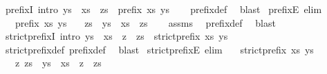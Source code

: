 \begin{isabellebody}
\endisatagproof
{\isafoldproof}%
%
\isadelimproof
\isanewline
%
\endisadelimproof
\isanewline
{}\isamarkupfalse%
\ prefixI\ {\isacharbrackleft}intro{\isacharquery}{\isacharbrackright}{\isacharcolon}\ {\isachardoublequoteopen}ys\ {\isacharequal}\ xs\ {\isacharat}\ zs\ {\isasymLongrightarrow}\ prefix\ xs\ ys{\isachardoublequoteclose}\isanewline
%
\isadelimproof
\ \ %
\endisadelimproof
%
\isatagproof
{}\isamarkupfalse%
\ prefix{\isacharunderscore}def\ \isamarkupfalse%
\ blast%
\endisatagproof
{\isafoldproof}%
%
\isadelimproof
\isanewline
%
\endisadelimproof
\isanewline
{}\isamarkupfalse%
\ prefixE\ {\isacharbrackleft}elim{\isacharquery}{\isacharbrackright}{\isacharcolon}\isanewline
\ \ \ {\isachardoublequoteopen}prefix\ xs\ ys{\isachardoublequoteclose}\isanewline
\ \ \ zs\ \ {\isachardoublequoteopen}ys\ {\isacharequal}\ xs\ {\isacharat}\ zs{\isachardoublequoteclose}\isanewline
%
\isadelimproof
\ \ %
\endisadelimproof
%
\isatagproof
{}\isamarkupfalse%
\ assms\ \isamarkupfalse%
\ prefix{\isacharunderscore}def\ \isamarkupfalse%
\ blast%
\endisatagproof
{\isafoldproof}%
%
\isadelimproof
\isanewline
%
\endisadelimproof
\isanewline
{}\isamarkupfalse%
\ strict{\isacharunderscore}prefixI{\isacharprime}\ {\isacharbrackleft}intro{\isacharquery}{\isacharbrackright}{\isacharcolon}\ {\isachardoublequoteopen}ys\ {\isacharequal}\ xs\ {\isacharat}\ z\ {\isacharhash}\ zs\ {\isasymLongrightarrow}\ strict{\isacharunderscore}prefix\ xs\ ys{\isachardoublequoteclose}\isanewline
%
\isadelimproof
\ \ %
\endisadelimproof
%
\isatagproof
{}\isamarkupfalse%
\ strict{\isacharunderscore}prefix{\isacharunderscore}def\ prefix{\isacharunderscore}def\ \isamarkupfalse%
\ blast%
\endisatagproof
{\isafoldproof}%
%
\isadelimproof
\isanewline
%
\endisadelimproof
\isanewline
{}\isamarkupfalse%
\ strict{\isacharunderscore}prefixE{\isacharprime}\ {\isacharbrackleft}elim{\isacharquery}{\isacharbrackright}{\isacharcolon}\isanewline
\ \ \ {\isachardoublequoteopen}strict{\isacharunderscore}prefix\ xs\ ys{\isachardoublequoteclose}\isanewline
\ \ \ z\ zs\ \ {\isachardoublequoteopen}ys\ {\isacharequal}\ xs\ {\isacharat}\ z\ {\isacharhash}\ zs{\isachardoublequoteclose}\isanewline
%
\isadelimproof
%
\endisadelimproof
%
\isatagproof
{}\isamarkupfalse%
\ {\isacharminus}\isanewline
\ \ \isamarkupfalse%

\end{isabellebody}

